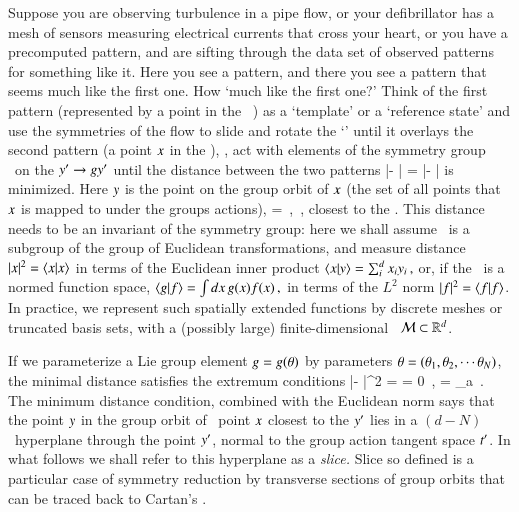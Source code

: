 

Suppose you are observing turbulence in a pipe flow, or your
defibrillator has a mesh of sensors measuring electrical currents that
cross your heart, or you have a precomputed pattern, and are sifting
through the data set of observed patterns for something like it. Here you
see a pattern, and there you see a pattern that seems much like the first
one. How `much like the first one?' Think of the first pattern
(represented by a point {\slicep} in the \statesp\  \pS) as a
`template' or a
`reference state' and use the symmetries of the flow to slide and rotate
the `{\template}' until it overlays the second pattern (a point $x$ in
the \statesp), \ie, act with elements of the symmetry group \Group\ on
the {\template} ${{y'}} \to {\ensuremath{g}}{{\ensuremath{y'}}}$ until the distance between
the two patterns
\beq
|\ssp - {\LieEl}{\slicep}|
    = |\sspRed - \slicep|
\label{minDistance0}
\eeq
is minimized. Here $y$ is the point on the group orbit of $x$
(the set of all points that $x$ is mapped to under the groups
actions),
\beq
\ssp=\LieEl \sspRed
	\,,\qquad
\LieEl \in \Group
\,,
closest to the {\template} {\slicep}.
This distance needs to be an invariant of the symmetry group: here
we shall assume \Group\ is a subgroup of the group of Euclidean
transformations, and measure distance
$|\ssp|^2=\braket{\ssp}{\ssp}$ in terms of the Euclidean inner product
\( %
\braket{x}{y} = \sum_i^d {x}_i y_i
	\,,
\) %
or, if the \statesp\ is a normed function space,
\( %
\braket{g}{f} = \int dx \, {g}(x) f(x)
\,,
\) %
in terms of the $L^2$ norm $|f|^2 = \braket{f}{f}$.
In practice, we represent such spatially extended functions by discrete
meshes or truncated basis sets, with a (possibly large)
finite-dimensional \statesp\  $\pS \subset \reals^d$.

If we parameterize a Lie group element $\LieEl=\LieEl(\gSpace)$ by
parameters $\gSpace = (\gSpace_1,\gSpace_2,\cdots\gSpace_N)$, the minimal
distance satisfies the extremum conditions
\beq
{} |\ssp - \LieEl\slicep|^2
   =
   = 0
    \,,\qquad
	   = \Lg_a \slicep
\,.
\label{PCsectQ}
\eeq
The minimum distance condition, combined with the Euclidean norm says
that the point $y$ in the group orbit of \statesp\ point $x$
closest to the {\template} ${y'}$ lies in a $(d\!-\!N)$\dmn\ hyperplane
through the point ${y'}$, normal to the group action tangent space
$t'_{}$. In what follows we shall refer to this hyperplane as a
\emph{slice.} Slice so defined is a particular case of symmetry reduction
by transverse sections of group
orbits that can be traced back to
Cartan's \mframes{}.

